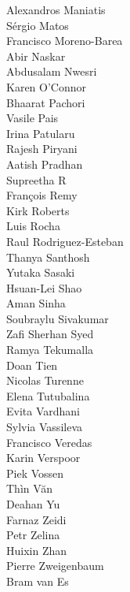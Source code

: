\documentclass[11pt,oneside]{book}
\begin{document}
\begin{description}
          Alexandros Maniatis\\
          Sérgio Matos\\
          Francisco Moreno-Barea\\
          Abir Naskar\\
          Abdusalam Nwesri\\
          Karen O'Connor\\
          Bhaarat Pachori\\
          Vasile Pais\\
          Irina Patularu\\
          Rajesh Piryani\\
          Aatish Pradhan\\
          Supreetha R\\
          François Remy\\
          Kirk Roberts\\
          Luis Rocha\\
          Raul Rodriguez-Esteban\\
          Thanya Santhosh\\
          Yutaka Sasaki\\
          Hsuan-Lei Shao\\
          Aman Sinha\\
          Soubraylu Sivakumar\\
          Zafi Sherhan Syed\\
          Ramya Tekumalla\\
          Doan Tien\\
          Nicolas Turenne\\
          Elena Tutubalina\\
          Evita Vardhani\\
          Sylvia Vassileva\\
          Francisco Veredas\\
          Karin Verspoor\\
          Piek Vossen\\
          Thìn Văn\\
          Deahan Yu\\
          Farnaz Zeidi\\
          Petr Zelina\\
          Huixin Zhan\\
          Pierre Zweigenbaum\\
          Bram van Es\\
      
\end{description}
\newpage
\end{document}
